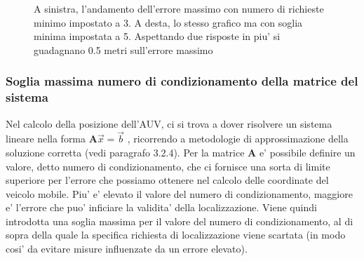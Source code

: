\begin{figure}[H]
    \centering
    \hfill
    \caption{A sinistra, l'andamento dell'errore massimo con numero di richieste minimo impostato a 3. A desta, lo stesso grafico ma con soglia minima impostata a 5. Aspettando due risposte in piu' si guadagnano 0.5 metri sull'errore massimo}
\end{figure}
\subsubsection{Soglia massima numero di condizionamento della matrice del sistema}
\par
Nel calcolo della posizione dell'AUV, ci si trova a dover risolvere un sistema lineare nella forma  \(\textbf{A}\overrightarrow{x} = \overrightarrow{b} \) , ricorrendo a metodologie di approssimazione della soluzione corretta (vedi paragrafo 3.2.4). Per la matrice \(\textbf{A}\) e' possibile definire un valore, detto numero di condizionamento, che ci fornisce una sorta di limite superiore  per l'errore che possiamo ottenere nel calcolo delle coordinate del veicolo mobile. Piu' e' elevato il valore del numero di condizionamento, maggiore e' l'errore che puo' inficiare la validita' della localizzazione. Viene quindi introdotta una soglia massima per il valore del numero di condizionamento, al di sopra della quale la specifica richiesta di localizzazione viene scartata (in modo cosi' da evitare misure influenzate da un errore elevato).
